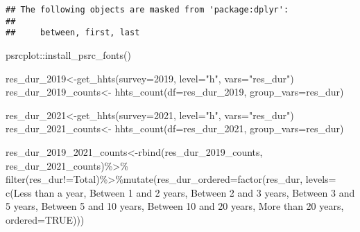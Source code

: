\documentclass[
]{article}
\newenvironment{Shaded}{\begin{snugshade}}{\end{snugshade}}
\newcommand{\AttributeTok}[1]{\textcolor[rgb]{0.77,0.63,0.00}{#1}}
\newcommand{\ConstantTok}[1]{\textcolor[rgb]{0.00,0.00,0.00}{#1}}
\newcommand{\FunctionTok}[1]{\textcolor[rgb]{0.00,0.00,0.00}{#1}}
\newcommand{\NormalTok}[1]{#1}
\newcommand{\OtherTok}[1]{\textcolor[rgb]{0.56,0.35,0.01}{#1}}
\newcommand{\SpecialCharTok}[1]{\textcolor[rgb]{0.00,0.00,0.00}{#1}}
\newcommand{\StringTok}[1]{\textcolor[rgb]{0.31,0.60,0.02}{#1}}
\begin{document}
\begin{verbatim}
## The following objects are masked from 'package:dplyr':
## 
##     between, first, last
\end{verbatim}

\begin{Shaded}
\begin{Highlighting}[]
\NormalTok{psrcplot}\SpecialCharTok{::}\FunctionTok{install\_psrc\_fonts}\NormalTok{()}

\NormalTok{res\_dur\_2019}\OtherTok{\textless{}{-}}\FunctionTok{get\_hhts}\NormalTok{(}\AttributeTok{survey=}\StringTok{\textquotesingle{}2019\textquotesingle{}}\NormalTok{, }\AttributeTok{level=}\StringTok{"h"}\NormalTok{, }\AttributeTok{vars=}\StringTok{"res\_dur"}\NormalTok{)}
\NormalTok{res\_dur\_2019\_counts}\OtherTok{\textless{}{-}} \FunctionTok{hhts\_count}\NormalTok{(}\AttributeTok{df=}\NormalTok{res\_dur\_2019, }\AttributeTok{group\_vars=}\StringTok{\textquotesingle{}res\_dur\textquotesingle{}}\NormalTok{)}


\NormalTok{res\_dur\_2021}\OtherTok{\textless{}{-}}\FunctionTok{get\_hhts}\NormalTok{(}\AttributeTok{survey=}\StringTok{\textquotesingle{}2021\textquotesingle{}}\NormalTok{, }\AttributeTok{level=}\StringTok{"h"}\NormalTok{, }\AttributeTok{vars=}\StringTok{"res\_dur"}\NormalTok{)}
\NormalTok{res\_dur\_2021\_counts}\OtherTok{\textless{}{-}} \FunctionTok{hhts\_count}\NormalTok{(}\AttributeTok{df=}\NormalTok{res\_dur\_2021, }\AttributeTok{group\_vars=}\StringTok{\textquotesingle{}res\_dur\textquotesingle{}}\NormalTok{)}

\NormalTok{res\_dur\_2019\_2021\_counts}\OtherTok{\textless{}{-}}\FunctionTok{rbind}\NormalTok{(res\_dur\_2019\_counts, res\_dur\_2021\_counts)}\SpecialCharTok{\%\textgreater{}\%}
\FunctionTok{filter}\NormalTok{(res\_dur}\SpecialCharTok{!=}\StringTok{\textquotesingle{}Total\textquotesingle{}}\NormalTok{)}\SpecialCharTok{\%\textgreater{}\%}\FunctionTok{mutate}\NormalTok{(}\AttributeTok{res\_dur\_ordered=}\FunctionTok{factor}\NormalTok{(res\_dur, }\AttributeTok{levels=} \FunctionTok{c}\NormalTok{(}\StringTok{\textquotesingle{}Less than a year\textquotesingle{}}\NormalTok{, }\StringTok{\textquotesingle{}Between 1 and 2 years\textquotesingle{}}\NormalTok{,}
                                                                    \StringTok{\textquotesingle{}Between 2 and 3 years\textquotesingle{}}\NormalTok{, }\StringTok{\textquotesingle{}Between 3 and 5 years\textquotesingle{}}\NormalTok{,}
                                                                    \StringTok{\textquotesingle{}Between 5 and 10 years\textquotesingle{}}\NormalTok{, }\StringTok{\textquotesingle{}Between 10 and 20 years\textquotesingle{}}\NormalTok{, }\StringTok{\textquotesingle{}More than 20 years\textquotesingle{}}\NormalTok{, }\AttributeTok{ordered=}\ConstantTok{TRUE}\NormalTok{)))}



\end{Highlighting}
\end{Shaded}
\end{document}
